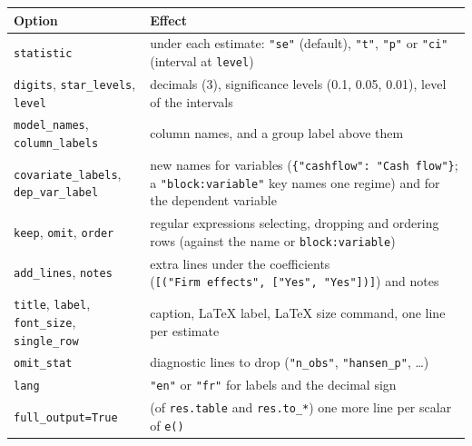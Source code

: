 \documentclass[
  10.5pt,
  a4paper,
]{article}
\newcounter{none} %
\begin{document}
{\def\LTcaptype{none} %
\begin{longtable}[]{@{}
  >{\raggedright\arraybackslash}p{}
  >{\raggedright\arraybackslash}p{}@{}}
\toprule\noalign{}
\begin{minipage}[b]{\linewidth}\raggedright
Option
\end{minipage} & \begin{minipage}[b]{\linewidth}\raggedright
Effect
\end{minipage} \\
\midrule\noalign{}
\endhead
\bottomrule\noalign{}
\endlastfoot
\texttt{statistic} & under each estimate: \texttt{"se"} (default),
\texttt{"t"}, \texttt{"p"} or \texttt{"ci"} (interval at
\texttt{level}) \\
\texttt{digits}, \texttt{star\_levels}, \texttt{level} & decimals (3),
significance levels (0.1, 0.05, 0.01), level of the intervals \\
\texttt{model\_names}, \texttt{column\_labels} & column names, and a
group label above them \\
\texttt{covariate\_labels}, \texttt{dep\_var\_label} & new names for
variables (\texttt{\{"cashflow":\ "Cash\ flow"\}}; a
\texttt{"block:variable"} key names one regime) and for the dependent
variable \\
\texttt{keep}, \texttt{omit}, \texttt{order} & regular expressions
selecting, dropping and ordering rows (against the name or
\texttt{block:variable}) \\
\texttt{add\_lines}, \texttt{notes} & extra lines under the coefficients
(\texttt{{[}("Firm\ effects",\ {[}"Yes",\ "Yes"{]}){]}}) and notes \\
\texttt{title}, \texttt{label}, \texttt{font\_size},
\texttt{single\_row} & caption, LaTeX label, LaTeX size command, one
line per estimate \\
\texttt{omit\_stat} & diagnostic lines to drop (\texttt{"n\_obs"},
\texttt{"hansen\_p"}, \ldots) \\
\texttt{lang} & \texttt{"en"} or \texttt{"fr"} for labels and the
decimal sign \\
\texttt{full\_output=True} & (of \texttt{res.table} and
\texttt{res.to\_*}) one more line per scalar of \texttt{e()} \\
\end{longtable}
}
\end{document}
